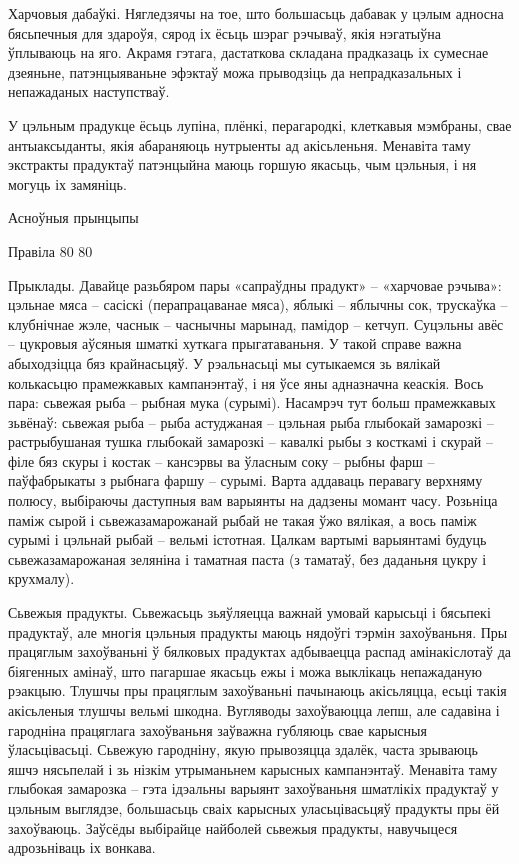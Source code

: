 Харчовыя дабаўкі.
Нягледзячы на тое, што большасьць дабавак у цэлым адносна бясьпечныя для здароўя, сярод іх ёсьць шэраг рэчываў, якія нэгатыўна ўплываюць на яго. Акрамя гэтага, дастаткова складана прадказаць іх сумеснае дзеяньне, патэнцыяваньне эфэктаў можа прыводзіць да непрадказальных і непажаданых наступстваў.

У цэльным прадукце ёсьць лупіна, плёнкі, перагародкі, клеткавыя мэмбраны, свае антыаксыданты, якія абараняюць нутрыенты ад акісьленьня. Менавіта таму экстракты прадуктаў патэнцыйна маюць горшую якасьць, чым цэльныя, і ня могуць іх замяніць.

Асноўныя прынцыпы

Правіла 80%
80%

Прыклады.
Давайце разьбяром пары «сапраўдны прадукт» – «харчовае рэчыва»: цэльнае мяса – сасіскі (перапрацаванае мяса), яблыкі – яблычны сок, трускаўка – клубнічнае жэле, часнык – часнычны марынад, памідор – кетчуп. Суцэльны авёс – цукровыя аўсяныя шматкі хуткага прыгатаваньня. У такой справе важна абыходзіцца бяз крайнасьцяў. У рэальнасьці мы сутыкаемся зь вялікай колькасьцю прамежкавых кампанэнтаў, і ня ўсе яны адназначна кеаскія. Вось пара: сьвежая рыба – рыбная мука (сурымі). Насамрэч тут больш прамежкавых зьвёнаў: сьвежая рыба – рыба астуджаная – цэльная рыба глыбокай замарозкі – растрыбушаная тушка глыбокай замарозкі – кавалкі рыбы з косткамі і скурай – філе бяз скуры і костак – кансэрвы ва ўласным соку – рыбны фарш – паўфабрыкаты з рыбнага фаршу – сурымі. Варта аддаваць перавагу верхняму полюсу, выбіраючы даступныя вам варыянты на дадзены момант часу. Розьніца паміж сырой і сьвежазамарожанай рыбай не такая ўжо вялікая, а вось паміж сурымі і цэльнай рыбай – вельмі істотная. Цалкам вартымі варыянтамі будуць сьвежазамарожаная зеляніна і таматная паста (з таматаў, без даданьня цукру і крухмалу).

Сьвежыя прадукты.
Сьвежасьць зьяўляецца важнай умовай карысьці і бясьпекі прадуктаў, але многія цэльныя прадукты маюць нядоўгі тэрмін захоўваньня. Пры працяглым захоўваньні ў бялковых прадуктах адбываецца распад амінакіслотаў да біягенных амінаў, што пагаршае якасьць ежы і можа выклікаць непажаданую рэакцыю. Тлушчы пры працяглым захоўваньні пачынаюць акісьляцца, есьці такія акісьленыя тлушчы вельмі шкодна. Вугляводы захоўваюцца лепш, але садавіна і гародніна працяглага захоўваньня заўважна губляюць свае карысныя ўласьцівасьці. Сьвежую гародніну, якую прывозяцца здалёк, часта зрываюць яшчэ нясьпелай і зь нізкім утрыманьнем карысных кампанэнтаў. Менавіта таму глыбокая замарозка – гэта ідэальны варыянт захоўваньня шматлікіх прадуктаў у цэльным выглядзе, большасьць сваіх карысных уласьцівасьцяў прадукты пры ёй захоўваюць. Заўсёды выбірайце найболей сьвежыя прадукты, навучыцеся адрозьніваць іх вонкава.

